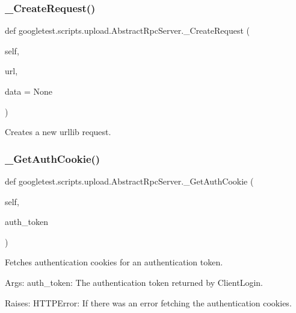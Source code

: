 \subsubsection{\texorpdfstring{\_CreateRequest()}{\_CreateRequest()}}
{\footnotesize\ttfamily def googletest.\+scripts.\+upload.\+Abstract\+Rpc\+Server.\+\_\+\+Create\+Request (\begin{DoxyParamCaption}\item[{}]{self,  }\item[{}]{url,  }\item[{}]{data = {\ttfamily None} }\end{DoxyParamCaption})\hspace{0.3cm}{\ttfamily [private]}}

\begin{DoxyVerb}Creates a new urllib request.\end{DoxyVerb}
 \mbox{\label{classgoogletest_1_1scripts_1_1upload_1_1_abstract_rpc_server_af3cbdd69919ed357d6bbc7534f57cccb}} 
\subsubsection{\texorpdfstring{\_GetAuthCookie()}{\_GetAuthCookie()}}
{\footnotesize\ttfamily def googletest.\+scripts.\+upload.\+Abstract\+Rpc\+Server.\+\_\+\+Get\+Auth\+Cookie (\begin{DoxyParamCaption}\item[{}]{self,  }\item[{}]{auth\+\_\+token }\end{DoxyParamCaption})\hspace{0.3cm}{\ttfamily [private]}}

\begin{DoxyVerb}Fetches authentication cookies for an authentication token.

Args:
  auth_token: The authentication token returned by ClientLogin.

Raises:
  HTTPError: If there was an error fetching the authentication cookies.
\end{DoxyVerb}
 \mbox{\label{classgoogletest_1_1scripts_1_1upload_1_1_abstract_rpc_server_ae9e21041be83376ddd74a66919e0e59f}} 
